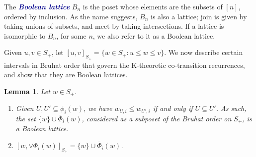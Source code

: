 \documentclass[12 pt]{amsart}
\newcommand{\newword}[1]{\textcolor{darkblue}{\textbf{\emph{#1}}}}
\newtheorem{lemma}[Theorem]{Lemma}
\numberwithin{equation}{section}
\theoremstyle{remark}
\newcommand{\cotransitionperms}{\Phi}
\newcommand{\cotransitionindices}{\phi}
\newcommand{\kcotransitionperms}{\overline{\Phi}}
\begin{document}
		
		
		The \newword{Boolean lattice} $B_n$ is the poset whose elements are the subsets of $[n]$, ordered by inclusion. 
		As the name suggests, $B_n$ is also a lattice; join is given by taking unions of subsets, and meet by taking intersections. 
		If a lattice is isomorphic to $B_n$, for some $n$, we also refer to it as a Boolean lattice. 
		
		
		Given $u,v \in S_{+} $, let $[u,v]_{S_{+} } = \{w \in S_{+} :u\leq w\leq v\}$. 
		We now describe certain intervals in Bruhat order that govern the K-theoretic co-transition recurrences, and show that they are Boolean lattices.
		
		\begin{lemma}
			\label{lemma:booleaninterval}
			Let $w \in S_{+} $.
			\begin{enumerate}
				\item Given $U,U'\subseteq \cotransitionindices_{i}(w)$, we have $w_{U,i}\leq w_{U',i}$ if and only if $U\subseteq U'$. As such, the set $\{w\} \cup \kcotransitionperms_i(w)$, considered as a subposet of the Bruhat order on $S_{+}$, is a Boolean lattice. 				
				\item $[w,\vee \cotransitionperms_i(w)]_{S_{+}} = \{w\} \cup \kcotransitionperms_i(w)$.
			\end{enumerate} 
		\end{lemma}
		
\end{document}
